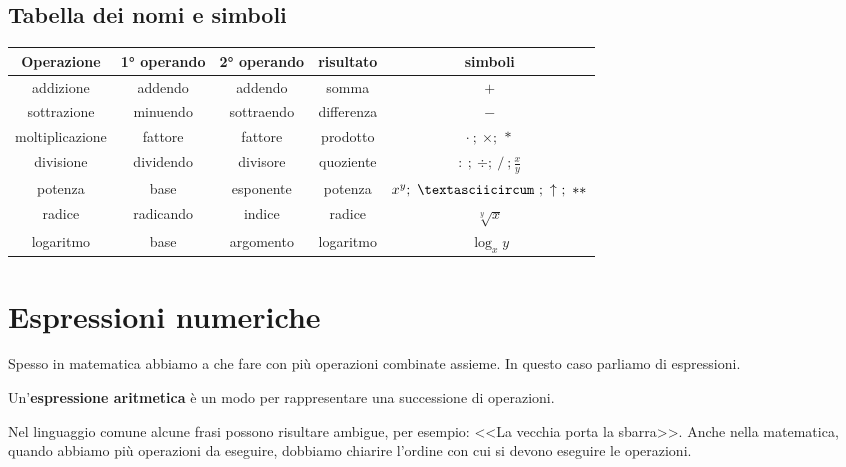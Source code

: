\subsection{Tabella dei nomi e simboli}

\begin{center}
\begin{tabular}{ccccc}
Operazione & 1° operando & 2° operando & risultato & simboli\\ \hline %
addizione & addendo & addendo & somma & \(+\) \\
sottrazione & minuendo & sottraendo & differenza & \(-\) \\
moltiplicazione & fattore & fattore & prodotto & \(\cdot~;~\times;~*\) \\
divisione & dividendo & divisore & quoziente & 
\(:~;~\div;~/~; \frac{x}{y}\) \\
potenza & base & esponente & potenza & 
\(x^y;~\textasciicircum~;~\uparrow~;~**\) \\
radice & radicando & indice & radice & \(\sqrt[y]{x}\) \\
logaritmo & base & argomento & logaritmo & \(\log_{x}{y}\) \\
\hline
\end{tabular}
\end{center}


\section{Espressioni numeriche}
\label{sec:nat_espressioni}

Spesso in matematica abbiamo a che fare con più operazioni combinate 
assieme.
In questo caso parliamo di espressioni.

\begin{definizione}{}{}
Un'\textbf{espressione aritmetica} è un modo per rappresentare una 
successione di operazioni.
\end{definizione}

Nel linguaggio comune alcune frasi possono risultare ambigue, per esempio:
<<La vecchia porta la sbarra>>. 
Anche nella matematica, quando abbiamo più operazioni da eseguire, dobbiamo 
chiarire l'ordine con cui si devono eseguire le operazioni. 

